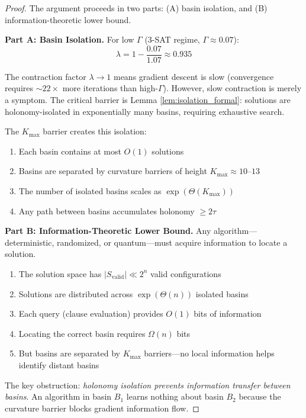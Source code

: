 \documentclass[11pt,a4paper]{article}
\theoremstyle{plain}
\theoremstyle{definition}
\theoremstyle{remark}
\begin{document}
\begin{proof}
The argument proceeds in two parts: (A) basin isolation, and (B) information-theoretic lower bound.

\textbf{Part A: Basin Isolation.}
For low $\Gamma$ (3-SAT regime, $\Gamma \approx 0.07$):
\begin{equation}
    \lambda = 1 - \frac{0.07}{1.07} \approx 0.935
\end{equation}

The contraction factor $\lambda \to 1$ means gradient descent is slow (convergence requires $\sim 22\times$ more iterations than high-$\Gamma$). However, slow contraction is merely a symptom. The critical barrier is Lemma \ref{lem:isolation_formal}: solutions are holonomy-isolated in exponentially many basins, requiring exhaustive search.

The $K_{\max}$ barrier creates this isolation:

\begin{enumerate}
    \item Each basin contains at most $O(1)$ solutions
    \item Basins are separated by curvature barriers of height $K_{\max} \approx 10$--$13$
    \item The number of isolated basins scales as $\exp(\Theta(K_{\max}))$
    \item Any path between basins accumulates holonomy $\geq 2\tau$
\end{enumerate}

\textbf{Part B: Information-Theoretic Lower Bound.}
Any algorithm---deterministic, randomized, or quantum---must acquire information to locate a solution.

\begin{enumerate}
    \item The solution space has $|S_{\text{valid}}| \ll 2^n$ valid configurations
    \item Solutions are distributed across $\exp(\Theta(n))$ isolated basins
    \item Each query (clause evaluation) provides $O(1)$ bits of information
    \item Locating the correct basin requires $\Omega(n)$ bits
    \item But basins are separated by $K_{\max}$ barriers---no local information helps identify distant basins
\end{enumerate}

The key obstruction: \emph{holonomy isolation prevents information transfer between basins}. An algorithm in basin $B_1$ learns nothing about basin $B_2$ because the curvature barrier blocks gradient information flow.


\end{proof}
\end{document}
